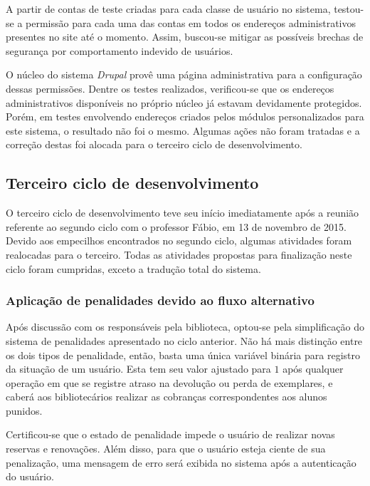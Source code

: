 \documentclass[a4paper]{article}
\begin{document}
A partir de contas de teste criadas para cada classe de usuário no sistema, testou-se a permissão para cada uma das contas em todos os endereços administrativos presentes no site até o momento. Assim, buscou-se mitigar as possíveis brechas de segurança por comportamento indevido de usuários.

O núcleo do sistema \textit{Drupal} provê uma página administrativa para a configuração dessas permissões. Dentre os testes realizados, verificou-se que os endereços administrativos disponíveis no próprio núcleo já estavam devidamente protegidos. Porém, em testes envolvendo endereços criados pelos módulos personalizados para este sistema, o resultado não foi o mesmo. Algumas ações não foram tratadas e a correção destas foi alocada para o terceiro ciclo de desenvolvimento.


\pagebreak
\subsection{Terceiro ciclo de desenvolvimento}

O terceiro ciclo de desenvolvimento teve seu início imediatamente após a reunião referente ao segundo ciclo com o professor Fábio, em 13 de novembro de 2015. Devido aos empecilhos encontrados no segundo ciclo, algumas atividades foram realocadas para o terceiro. Todas as atividades propostas para finalização neste ciclo foram cumpridas, exceto a tradução total do sistema.

\subsubsection{Aplicação de penalidades devido ao fluxo alternativo}
    
Após discussão com os responsáveis pela biblioteca, optou-se pela simplificação do sistema de penalidades apresentado no ciclo anterior. Não há mais distinção entre os dois tipos de penalidade, então, basta uma única variável binária para registro da situação de um usuário. Esta tem seu valor ajustado para $1$ após qualquer operação em que se registre atraso na devolução ou perda de exemplares, e caberá aos bibliotecários realizar as cobranças correspondentes aos alunos punidos.
    
Certificou-se que o estado de penalidade impede o usuário de realizar novas reservas e renovações. Além disso, para que o usuário esteja ciente de sua penalização, uma mensagem de erro será exibida no sistema após a autenticação do usuário. 
\end{document}
